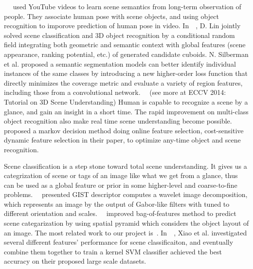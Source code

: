 \documentclass[12pt]{article}
\begin{document}
~~\citep{delaitre2012} used YouTube videos to learn scene semantics from long-term observation of people. They associate human pose with scene objects, and using object recognition to imporove prediction of human pose in video. In~~\citep{lin2013holistic}, D. Lin jointly solved scene classification and 3D object recognition by a conditional random field integrating both geometric and semantic context with global features (scene appearance, ranking potential, etc.) of generated candidate cuboids. N. Silberman et al. proposed a semantic segmentation models can better identify individual instances of the same classes by introducing a new higher-order loss function that directly minimizes the coverage metric and evaluate a variety of region features, including those from a convolutional network.~~\citep{SilbermanCoverage:ECCV14} (see more at ECCV 2014: Tutorial on 3D Scene Understanding) Human is capable to recognize a scene by a glance, and gain an insight in a short time. The rapid improvement on multi-class object recognition also make real time scene understanding become possible.~~\citep{karayevanytime} proposed a markov decision method doing online feature selection, cost-sensitive dynamic feature selection in their paper, to optimize any-time object and scene recognition. 

Scene classification is a step stone toward total scene understanding. It gives us a categrization of scene or tags of an image like what we get from a glance, thus can be used as a global feature or prior in some higher-level and coarse-to-fine problems.~~\citep{oliva2001modeling} presented GIST descriptor computes a wavelet image decomposition, which represents an image by the output of Gabor-like filters with tuned to different orientation and scales.~~\citep{lazebnik2006beyond} improved bag-of-features method to predict scene categarization by using spatial pyramid which considers the object layout of an image. The most related work to our project is~\citep{xiao2010sun}. In~~\citep{xiao2010sun}, Xiao et al. investigated several different features' performance for scene classificaiton, and eventually combine them together to train a kernel SVM classifier achieved the best accuracy on their proposed large scale datasets. 
\end{document}
